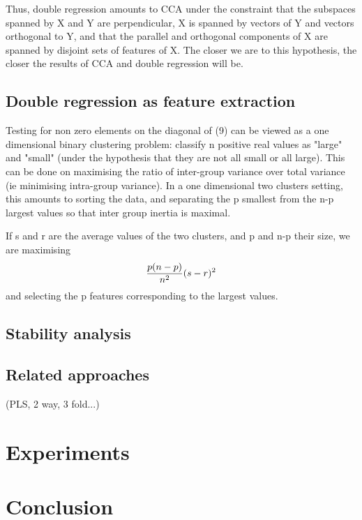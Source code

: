 \documentclass{article}
\begin{document}
Thus, double regression amounts to CCA under the constraint that the subspaces spanned by X and Y are perpendicular, X is spanned by vectors of Y and vectors orthogonal to Y, and that the parallel and orthogonal components of X are spanned by disjoint sets of features of X. The closer we are to this hypothesis, the closer the results of CCA and double regression will be.

\subsection{Double regression as feature extraction}

Testing for non zero elements on the diagonal of (9) can be viewed as a one dimensional binary clustering problem: classify n positive real values as "large" and "small" (under the hypothesis that they are not all small or all large). This can be done on maximising the ratio of inter-group variance over total variance (ie minimising intra-group variance). In a one dimensional two clusters setting, this amounts to sorting the data, and separating the p smallest from the n-p largest values so that inter group inertia is maximal. 

If s and r are the average values of the two clusters, and p and n-p their size, we are maximising 
\begin{equation}
\begin{aligned}
{p (n-p)\over n^2} (s-r)^2 
\end{aligned}
\end{equation}
 and selecting the p features corresponding to the largest values.

\subsection{Stability analysis}

\subsection{Related approaches}
(PLS, 2 way, 3 fold...)

\section{Experiments}

\section{Conclusion}

\clearpage
\newpage



\end{document}
